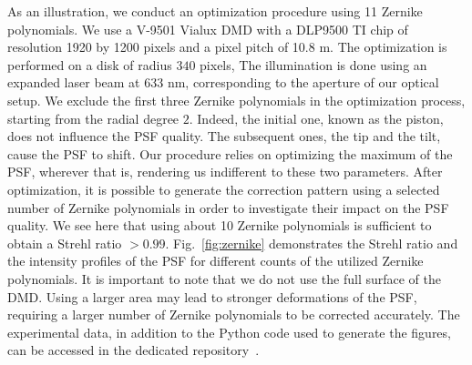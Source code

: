 \documentclass[12pt]{iopart}
\begin{document}
As an illustration, we conduct an optimization procedure using 11 Zernike polynomials.
We use a V-9501 Vialux DMD with a DLP9500 TI chip
of resolution 1920 by 1200 pixels and a pixel pitch of 10.8 \textmu m.
The optimization is performed on a disk of radius $340$ pixels,
The illumination is done using an expanded laser beam at 633 nm,
corresponding to the aperture of our optical setup.
We exclude the first three Zernike polynomials in the optimization process,
starting from the radial degree $2$.
Indeed, the initial one, known as the piston, does not influence the PSF quality.
The subsequent ones, the tip and the tilt, cause the PSF to shift.
Our procedure relies on optimizing the maximum of the PSF, wherever that is,
rendering us indifferent to these two parameters.
After optimization,
it is possible to generate the correction pattern using a selected number of Zernike polynomials
in order to investigate their impact on the PSF quality.
We see here that using about 10 Zernike polynomials is sufficient to obtain a Strehl ratio $>0.99$.
Fig.~\ref{fig:zernike} demonstrates the Strehl ratio and the intensity profiles of the PSF
for different counts of the utilized Zernike polynomials.
It is important to note that we do not use the full surface of the DMD.
Using a larger area may lead to stronger deformations of the PSF,
requiring a larger number of Zernike polynomials to be corrected accurately.
The experimental data, in addition to the Python code used to generate the figures, can be accessed in the dedicated repository~\cite{github}.\\
\end{document}

